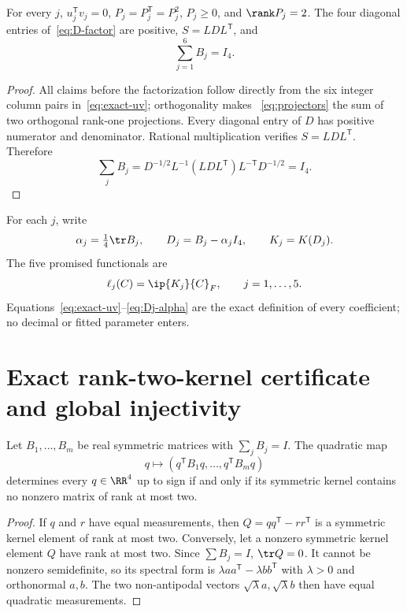 \begin{lemma}\label{lem:projectors}
\label{lem:whitening}
For every $j$, $u_j^\mathsf Tv_j=0$, $P_j=P_j^\mathsf T=P_j^2$,
$P_j\ge0$, and $\rank P_j=2$.  The four diagonal entries of~\eqref{eq:D-factor}
are positive, $S=LDL^\mathsf T$, and
\begin{equation}\label{eq:tight-sum}
 \sum_{j=1}^6B_j=I_4.
\end{equation}
\end{lemma}

\begin{proof}
All claims before the factorization follow directly from the six integer
column pairs in~\eqref{eq:exact-uv}; orthogonality makes
~\eqref{eq:projectors} the sum of two orthogonal rank-one projections.
Every diagonal entry of $D$ has positive numerator and denominator.
Rational multiplication verifies $S=LDL^\mathsf T$.  Therefore
\[
\sum_jB_j
=D^{-1/2}L^{-1}(LDL^\mathsf T)L^{-\mathsf T}D^{-1/2}=I_4.
\]
\end{proof}

For each $j$, write
\begin{equation}\label{eq:Dj-alpha}
 \alpha_j=\tfrac14\tr B_j,\qquad
 D_j=B_j-\alpha_jI_4,\qquad K_j=K(D_j).
\end{equation}
The five promised functionals are
\begin{equation}\label{eq:functionals}
 \ell_j(C)=\ip{K_j}{C}_F,\qquad j=1,\ldots,5.
\end{equation}
Equations~\eqref{eq:exact-uv}--\eqref{eq:Dj-alpha} are the exact definition of
every coefficient; no decimal or fitted parameter enters.

\section{Exact rank-two-kernel certificate and global injectivity}
\label{sec:certificate}

\begin{lemma}
\label{lem:rank-two-kernel}
Let $B_1,\ldots,B_m$ be real symmetric matrices with
$\sum_jB_j=I$.  The quadratic map
\[
 q\longmapsto(q^\mathsf TB_1q,\ldots,q^\mathsf TB_mq)
\]
determines every $q\in\RR^4$ up to sign if and only if its symmetric kernel
contains no nonzero matrix of rank at most two.
\end{lemma}

\begin{proof}
If $q$ and $r$ have equal measurements, then
$Q=qq^\mathsf T-rr^\mathsf T$ is a symmetric kernel element of rank at most
two.  Conversely, let a nonzero symmetric kernel element $Q$ have rank at
most two.  Since $\sum B_j=I$, $\tr Q=0$.  It cannot be nonzero semidefinite,
so its spectral form is $\lambda aa^\mathsf T-\lambda bb^\mathsf T$ with
$\lambda>0$ and orthonormal $a,b$.  The two non-antipodal vectors
$\sqrt\lambda a,\sqrt\lambda b$ then have equal quadratic measurements.
\end{proof}


